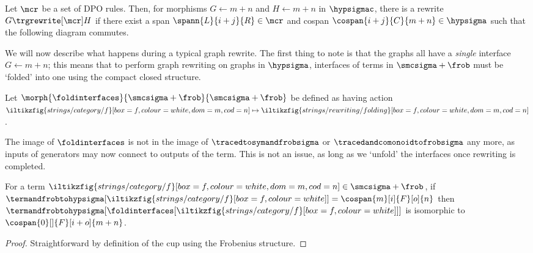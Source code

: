\begin{definition}\label{def:dpo-rewriting}
    Let \(\mcr\) be a set of DPO rules.
    Then, for morphisms \(G \leftarrow m + n\) and
    \(H \leftarrow m + n\) in
    \(\hypsigmac\), there is a rewrite \(G \trgrewrite[\mcr] H\) if there
    exist a span \(
    \spann{L}{i + j}{R} \in \mcr
    \) and cospan \(
    \cospan{i + j}{C}{m + n} \in \hypsigma
    \) such that the following diagram commutes.
    \begin{center}
    \end{center}
\end{definition}

We will now describe what happens during a typical graph rewrite.
The first thing to note is that the graphs all have a \emph{single} interface
\(G \leftarrow m + n\); this means that to perform graph rewriting on graphs in
\(\hypsigma\), interfaces of terms in \(\smcsigma + \frob\) must be `folded'
into one using the compact closed structure.

\begin{definition}\label{def:fold-interfaces}
    Let \(\morph{\foldinterfaces}{\smcsigma + \frob}{\smcsigma + \frob}\)
    be defined as having action \(
    \iltikzfig{strings/category/f}[box=f,colour=white,dom=m,cod=n]
    \mapsto
    \iltikzfig{strings/rewriting/folding}[box=f,colour=white,dom=m,cod=n]
    \).
\end{definition}

The image of \(\foldinterfaces\) is not in the image of
\(\tracedtosymandfrobsigma\) or \(\tracedandcomonoidtofrobsigma\) any more,
as inputs of generators may now connect to outputs of the term.
This is not an issue, as long as we `unfold' the interfaces once rewriting is
completed.

\begin{proposition}
    For a term \(
    \iltikzfig{strings/category/f}[box=f,colour=white,dom=m,cod=n]
    \in
    \smcsigma + \frob
    \), if \(
    \termandfrobtohypsigma[\iltikzfig{strings/category/f}[box=f,colour=white]]
    =
    \cospan{m}[i]{F}[o]{n}
    \) then \(
    \termandfrobtohypsigma[
        \foldinterfaces[
            \iltikzfig{strings/category/f}[box=f,colour=white]
        ]
    ]
    \) is isomorphic to \(
    \cospan{0}[]{F}[i+o]{m + n}
    \).
\end{proposition}
\begin{proof}
    Straightforward by definition of the cup using the Frobenius structure.
\end{proof}

